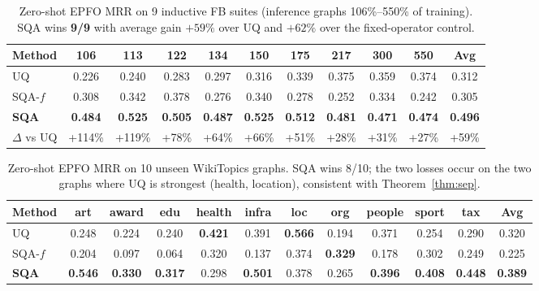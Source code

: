 \documentclass[journal]{IEEEtran}
\begin{document}
\begin{table}[t]
\centering
\caption{Zero-shot EPFO MRR on 9 inductive FB suites (inference graphs
106\%--550\% of training). SQA wins \textbf{9/9} with average gain
$+59\%$ over UQ and $+62\%$ over the fixed-operator control.}
\label{tab:indfb}
\small
\begin{tabular}{lccccccccc|c}
\toprule
Method & 106 & 113 & 122 & 134 & 150 & 175 & 217 & 300 & 550 & \textbf{Avg} \\
\midrule
UQ & 0.226 & 0.240 & 0.283 & 0.297 & 0.316 & 0.339 & 0.375 & 0.359 & 0.374 & 0.312 \\
SQA-$f$ & 0.308 & 0.342 & 0.378 & 0.276 & 0.340 & 0.278 & 0.252 & 0.334 & 0.242 & 0.305 \\
\textbf{SQA} & \textbf{0.484} & \textbf{0.525} & \textbf{0.505} & \textbf{0.487} & \textbf{0.525} & \textbf{0.512} & \textbf{0.481} & \textbf{0.471} & \textbf{0.474} & \textbf{0.496} \\
\midrule
$\Delta$ vs UQ & +114\% & +119\% & +78\% & +64\% & +66\% & +51\% & +28\% & +31\% & +27\% & +59\% \\
\bottomrule
\end{tabular}
\end{table}

\begin{table}[t]
\centering
\caption{Zero-shot EPFO MRR on 10 unseen WikiTopics graphs. SQA wins
8/10; the two losses occur on the two graphs where UQ is strongest
(health, location), consistent with Theorem~\ref{thm:sep}.}
\label{tab:wikitopics}
\small
\begin{tabular}{lcccccccccc|c}
\toprule
Method & art & award & edu & health & infra & loc & org & people & sport & tax & \textbf{Avg} \\
\midrule
UQ & 0.248 & 0.224 & 0.240 & \textbf{0.421} & 0.391 & \textbf{0.566} & 0.194 & 0.371 & 0.254 & 0.290 & 0.320 \\
SQA-$f$ & 0.204 & 0.097 & 0.064 & 0.320 & 0.137 & 0.374 & \textbf{0.329} & 0.178 & 0.302 & 0.249 & 0.225 \\
\textbf{SQA} & \textbf{0.546} & \textbf{0.330} & \textbf{0.317} & 0.298 & \textbf{0.501} & 0.378 & 0.265 & \textbf{0.396} & \textbf{0.408} & \textbf{0.448} & \textbf{0.389} \\
\bottomrule
\end{tabular}
\end{table}
\end{document}
